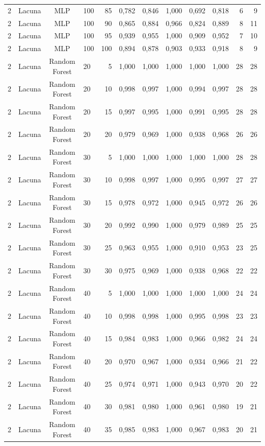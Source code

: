 \begin{longtable}{ccclrrrrrrrr}
2 & Lacuna & MLP & 100 & 85 & 0,782 & 0,846 & 1,000 & 0,692 & 0,818 & 6 & 9 \\
2 & Lacuna & MLP & 100 & 90 & 0,865 & 0,884 & 0,966 & 0,824 & 0,889 & 8 & 11 \\
2 & Lacuna & MLP & 100 & 95 & 0,939 & 0,955 & 1,000 & 0,909 & 0,952 & 7 & 10 \\
2 & Lacuna & MLP & 100 & 100 & 0,894 & 0,878 & 0,903 & 0,933 & 0,918 & 8 & 9 \\
2 & Lacuna & Random Forest & 20 & 5 & 1,000 & 1,000 & 1,000 & 1,000 & 1,000 & 28 & 28 \\
2 & Lacuna & Random Forest & 20 & 10 & 0,998 & 0,997 & 1,000 & 0,994 & 0,997 & 28 & 28 \\
2 & Lacuna & Random Forest & 20 & 15 & 0,997 & 0,995 & 1,000 & 0,991 & 0,995 & 28 & 28 \\
2 & Lacuna & Random Forest & 20 & 20 & 0,979 & 0,969 & 1,000 & 0,938 & 0,968 & 26 & 26 \\
2 & Lacuna & Random Forest & 30 & 5 & 1,000 & 1,000 & 1,000 & 1,000 & 1,000 & 28 & 28 \\
2 & Lacuna & Random Forest & 30 & 10 & 0,998 & 0,997 & 1,000 & 0,995 & 0,997 & 27 & 27 \\
2 & Lacuna & Random Forest & 30 & 15 & 0,978 & 0,972 & 1,000 & 0,945 & 0,972 & 26 & 26 \\
2 & Lacuna & Random Forest & 30 & 20 & 0,992 & 0,990 & 1,000 & 0,979 & 0,989 & 25 & 25 \\
2 & Lacuna & Random Forest & 30 & 25 & 0,963 & 0,955 & 1,000 & 0,910 & 0,953 & 23 & 25 \\
2 & Lacuna & Random Forest & 30 & 30 & 0,975 & 0,969 & 1,000 & 0,938 & 0,968 & 22 & 22 \\
2 & Lacuna & Random Forest & 40 & 5 & 1,000 & 1,000 & 1,000 & 1,000 & 1,000 & 24 & 24 \\
2 & Lacuna & Random Forest & 40 & 10 & 0,998 & 0,998 & 1,000 & 0,995 & 0,998 & 23 & 23 \\
2 & Lacuna & Random Forest & 40 & 15 & 0,984 & 0,983 & 1,000 & 0,966 & 0,982 & 24 & 24 \\
2 & Lacuna & Random Forest & 40 & 20 & 0,970 & 0,967 & 1,000 & 0,934 & 0,966 & 21 & 22 \\
2 & Lacuna & Random Forest & 40 & 25 & 0,974 & 0,971 & 1,000 & 0,943 & 0,970 & 20 & 22 \\
2 & Lacuna & Random Forest & 40 & 30 & 0,981 & 0,980 & 1,000 & 0,961 & 0,980 & 19 & 21 \\
2 & Lacuna & Random Forest & 40 & 35 & 0,985 & 0,983 & 1,000 & 0,967 & 0,983 & 20 & 21 \\

\end{longtable}
